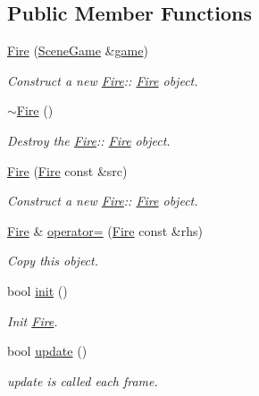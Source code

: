 \subsection*{Public Member Functions}
\begin{DoxyCompactItemize}
\item 
\hyperlink{class_fire_a04a8fa42a22f0e0adb7cb4bd6e8e678f}{Fire} (\hyperlink{class_scene_game}{Scene\+Game} \&\hyperlink{class_a_entity_aa2c05db944a8b7487eb8470dd20211ab}{game})
\begin{DoxyCompactList}\small\item\em Construct a new \hyperlink{class_fire}{Fire}\+:\+: \hyperlink{class_fire}{Fire} object. \end{DoxyCompactList}\item 
\mbox{\label{class_fire_ae5f95523457f6a91cc9df1543a80f824}} 
\hyperlink{class_fire_ae5f95523457f6a91cc9df1543a80f824}{$\sim$\+Fire} ()
\begin{DoxyCompactList}\small\item\em Destroy the \hyperlink{class_fire}{Fire}\+:\+: \hyperlink{class_fire}{Fire} object. \end{DoxyCompactList}\item 
\hyperlink{class_fire_ace320f43896cb0ff375f688e7ee6aea6}{Fire} (\hyperlink{class_fire}{Fire} const \&src)
\begin{DoxyCompactList}\small\item\em Construct a new \hyperlink{class_fire}{Fire}\+:\+: \hyperlink{class_fire}{Fire} object. \end{DoxyCompactList}\item 
\hyperlink{class_fire}{Fire} \& \hyperlink{class_fire_a5e11dd81a73d16b09253b17c89b32322}{operator=} (\hyperlink{class_fire}{Fire} const \&rhs)
\begin{DoxyCompactList}\small\item\em Copy this object. \end{DoxyCompactList}\item 
bool \hyperlink{class_fire_ae6456b9911e675ed1fb030f5f9e89cc8}{init} ()
\begin{DoxyCompactList}\small\item\em Init \hyperlink{class_fire}{Fire}. \end{DoxyCompactList}\item 
bool \hyperlink{class_fire_a86114cf78108a4b202b75e1f383b3e00}{update} ()
\begin{DoxyCompactList}\small\item\em update is called each frame. \end{DoxyCompactList}\item 

\end{DoxyCompactItemize}
